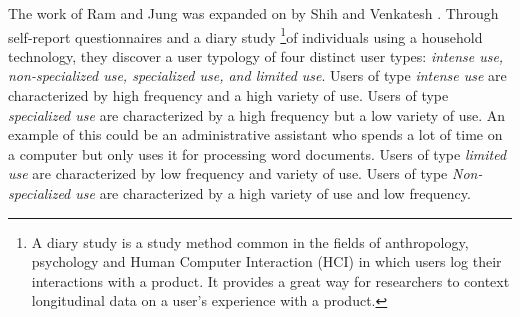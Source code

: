 \documentclass{acm_proc_article-sp}
\begin{document}
The work of Ram and Jung was expanded on by Shih and Venkatesh \cite{shih2004beyond}.  Through self-report questionnaires and a diary study \footnote{A diary study is a study method common in the fields of anthropology, psychology and Human Computer Interaction (HCI) in which users log their interactions with a product. It provides a great way for researchers to context longitudinal data on a user's experience with a product.}of individuals using a household technology, they discover a user typology of four distinct user types: \textit{intense use, non-specialized use, specialized use, and limited use}.
Users of type \textit{intense use} are characterized by high frequency and a high variety of use. Users of type \textit{specialized use} are characterized by a high frequency but a low variety of use. An example of this could be an administrative assistant who spends a lot of time on a computer but only uses it for processing word documents. Users of type \textit{limited use} are characterized by low frequency and variety of use. Users of type \textit{Non-specialized use} are characterized by a high variety of use and low frequency.
\end{document}
